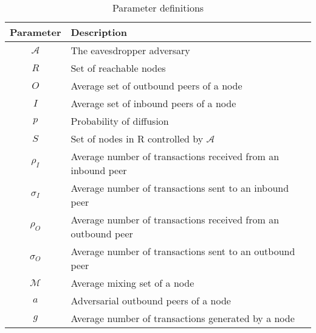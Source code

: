 \documentclass{article}
\begin{document}
	
	\begin{table}[t]
		\centering
		\begin{tabular}{cl}
			\hline
			Parameter 		& Description 					  \\ 
			\hline
			$\mathcal{A}$   & The eavesdropper adversary \\
			$R$             & Set of reachable nodes          \\
			$O$             & Average set of outbound peers of a node \\
			$I$             & Average set of inbound peers of a node  \\
			
			$p$             & Probability of diffusion        \\
			$S$             & Set of nodes in R controlled by $\mathcal{A}$  \\
			
			$\rho_I$        & Average number of transactions received from an inbound peer		 \\
			$\sigma_I$      & Average number of transactions sent to an inbound peer      			 \\
			$\rho_O$        & Average number of transactions received from an outbound peer 			 \\
			$\sigma_O$      & Average number of transactions sent to an outbound peer      			 \\
			
			$\mathcal{M}$	& Average mixing set of a node \\
			$a$				& Adversarial outbound peers of a node \\
			$g$				& Average number of transactions generated by a node \\
			
			\hline
		\end{tabular}
		\caption{Parameter definitions}
		\label{table:symbols}
	\end{table}
	
\end{document}
